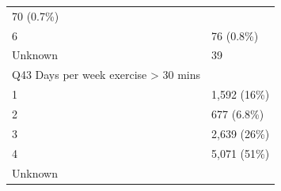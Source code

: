 \documentclass[]{article}
\begin{document}
\begin{longtable}[]{@{}ll@{}}
\begin{minipage}[t]{0.23\columnwidth}
70 (0.7\%)\strut
\end{minipage}\tabularnewline
\begin{minipage}[t]{0.71\columnwidth}\raggedright
6\strut
\end{minipage} & \begin{minipage}[t]{0.23\columnwidth}\raggedright
76 (0.8\%)\strut
\end{minipage}\tabularnewline
\begin{minipage}[t]{0.71\columnwidth}\raggedright
Unknown\strut
\end{minipage} & \begin{minipage}[t]{0.23\columnwidth}\raggedright
39\strut
\end{minipage}\tabularnewline
\begin{minipage}[t]{0.71\columnwidth}\raggedright
Q43 Days per week exercise \textgreater{} 30 mins\strut
\end{minipage} & \begin{minipage}[t]{0.23\columnwidth}\raggedright
\strut
\end{minipage}\tabularnewline
\begin{minipage}[t]{0.71\columnwidth}\raggedright
1\strut
\end{minipage} & \begin{minipage}[t]{0.23\columnwidth}\raggedright
1,592 (16\%)\strut
\end{minipage}\tabularnewline
\begin{minipage}[t]{0.71\columnwidth}\raggedright
2\strut
\end{minipage} & \begin{minipage}[t]{0.23\columnwidth}\raggedright
677 (6.8\%)\strut
\end{minipage}\tabularnewline
\begin{minipage}[t]{0.71\columnwidth}\raggedright
3\strut
\end{minipage} & \begin{minipage}[t]{0.23\columnwidth}\raggedright
2,639 (26\%)\strut
\end{minipage}\tabularnewline
\begin{minipage}[t]{0.71\columnwidth}\raggedright
4\strut
\end{minipage} & \begin{minipage}[t]{0.23\columnwidth}\raggedright
5,071 (51\%)\strut
\end{minipage}\tabularnewline
\begin{minipage}[t]{0.71\columnwidth}\raggedright
Unknown\strut
\end{minipage} & \begin{minipage}[t]{0.23\columnwidth}\raggedright

\end{minipage}
\end{longtable}
\end{document}
